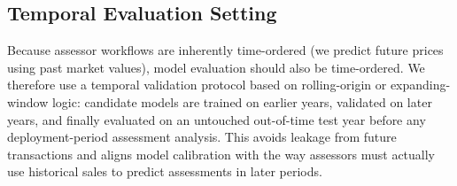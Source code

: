 \documentclass[12pt]{article}
\theoremstyle{plain}
\newtheorem{proposition}{Proposition}
\theoremstyle{definition}
\newcommand{\E}{\mathbb{E}}
\begin{document}


\subsection{Temporal Evaluation Setting}

Because assessor workflows are inherently time-ordered (we predict future prices using past market values), model evaluation should also be time-ordered. We therefore use a temporal validation protocol based on rolling-origin or expanding-window logic: candidate models are trained on earlier years, validated on later years, and finally evaluated on an untouched out-of-time test year before any deployment-period assessment analysis. This avoids leakage from future transactions and aligns model calibration with the way assessors must actually use historical sales to predict assessments in later periods.
\end{document}
